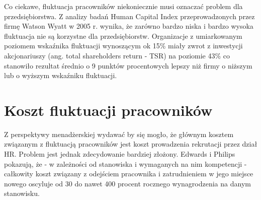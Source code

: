 Co ciekawe, fluktuacja pracowników niekoniecznie musi oznaczać problem dla przedsiębiorstwa.
Z analizy badań Human Capital Index przeprowadzonych przez firmę Watson Wyatt w 2005 r. wynika,
że zarówno bardzo niska i bardzo wysoka fluktuacja nie są korzystne dla przedsiębiorstw.
Organizacje z umiarkowanym poziomem wskaźnika fluktuacji wynoszącym ok 15\%
miały zwrot z inwestycji akcjonariuszy (ang. total shareholders return - TSR) na poziomie 43\%
co stanowiło rezultat średnio o 9 punktów procentowych lepszy niż firmy o niższym lub o wyższym wskaźniku fluktuacji\cite{krol-ludwiczynski-2006}.




\section{Koszt fluktuacji pracowników}\label{sec:employee-selection}

Z perspektywy menadżerskiej wydawać by się mogło, że głównym kosztem związanym z fluktuacją pracowników jest koszt prowadzenia rekrutacji przez dział HR.
Problem jest jednak zdecydowanie bardziej złożony.
Edwards i Philips\cite{philips-edwards-2009} pokazują, że - w zależności od stanowiska i wymaganych na nim kompetencji -
całkowity koszt związany z odejściem pracownika i zatrudnieniem w jego miejsce nowego oscyluje od 30 do nawet 400 procent
rocznego wynagrodzenia na danym stanowisku.

